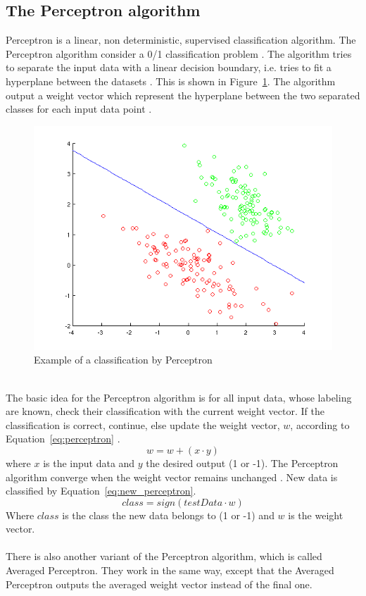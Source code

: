 \subsection{The Perceptron algorithm}
Perceptron is a linear, non deterministic, supervised classification algorithm. The Perceptron algorithm consider a 0/1 classification problem \citep{perceptron_ai}. 
The algorithm tries to separate the input data with a linear decision boundary, i.e. tries to fit a hyperplane between the datasets \citep{perceptron_url}. This is shown in Figure~\ref{fig:perceptron}. The algorithm output a weight vector which represent the hyperplane between the two separated classes for each input data point \citep{perceptron_url}. 
\begin{figure}[h!]
\centering
\includegraphics[scale = 0.4]{fig/perceptron_example.png}
\caption{Example of a classification by Perceptron}
\label{fig:perceptron}
\end{figure}\\
The basic idea for the Perceptron algorithm is for all input data, whose labeling are known, check their classification with the current weight vector. If the classification is correct, continue, else update the weight vector, $w$, according to Equation~\ref{eq:perceptron} \citep{perceptron_ai}. 
\begin{equation}
\label{eq:perceptron}
w = w + (x \cdot y)
\end{equation}
where $x$ is the input data and $y$ the desired output (1 or -1). The Perceptron algorithm converge when the weight vector remains unchanged \citep{perceptron_ai}. New data is classified by Equation~\ref{eq:new_perceptron}.
\begin{equation}
\label{eq:new_perceptron}
class = sign(testData \cdot w)
\end{equation}
Where $class$ is the class the new data belongs to (1 or -1) and $w$ is the weight vector.\\\\
There is also another variant of the Perceptron algorithm, which is called Averaged Perceptron. They work in the same way, except that the Averaged Perceptron outputs the averaged weight vector instead of the final one.

